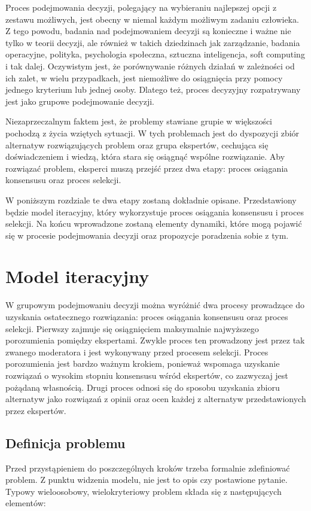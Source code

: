 Proces podejmowania decyzji, polegający na wybieraniu najlepszej opcji z 
zestawu możliwych, jest obecny w niemal każdym możliwym zadaniu człowieka. Z
tego powodu, badania nad podejmowaniem decyzji są konieczne i ważne nie tylko w 
teorii decyzji, ale również w takich dziedzinach jak zarządzanie, badania
operacyjne,  polityka, psychologia społeczna, sztuczna inteligencja, soft 
computing i tak dalej. Oczywistym jest, że porównywanie różnych działań w 
zależności od ich zalet, w wielu przypadkach, jest niemożliwe do osiągnięcia 
przy pomocy jednego kryterium lub jednej osoby. Dlatego też, proces decyzyjny 
rozpatrywany jest jako grupowe podejmowanie decyzji.

Niezaprzeczalnym faktem jest, że problemy stawiane grupie w większości pochodzą 
z życia wziętych sytuacji. W tych problemach jest do dyspozycji zbiór alternatyw
rozwiązujących problem oraz grupa ekspertów, cechująca się doświadczeniem i 
wiedzą, która stara się osiągnąć wspólne rozwiązanie. Aby rozwiązać problem, 
eksperci muszą przejść przez dwa etapy: proces osiągania konsensusu oraz proces 
selekcji.

W poniższym rozdziale te dwa etapy zostaną dokładnie opisane. Przedstawiony
będzie model iteracyjny, który wykorzystuje proces osiągania konsensusu i proces
selekcji. Na końcu wprowadzone zostaną elementy dynamiki, które mogą pojawić się
w procesie podejmowania decyzji oraz propozycje poradzenia sobie z tym.

\section{Model iteracyjny}
W grupowym podejmowaniu decyzji można wyróżnić dwa procesy prowadzące do
uzyskania ostatecznego rozwiązania: proces osiągania konsensusu oraz proces
selekcji. Pierwszy zajmuje się osiągnięciem maksymalnie najwyższego porozumienia
pomiędzy ekspertami. Zwykle proces ten prowadzony jest przez tak zwanego
moderatora i jest  wykonywany przed procesem selekcji. Proces porozumienia jest
bardzo ważnym krokiem, ponieważ wspomaga uzyskanie rozwiązań o wysokim stopniu
konsensusu wśród  ekspertów, co zazwyczaj jest pożądaną własnością. Drugi proces
odnosi się do sposobu uzyskania zbioru alternatyw jako rozwiązań z opinii oraz
ocen każdej z alternatyw przedstawionych przez ekspertów.

\subsection{Definicja problemu}
Przed przystąpieniem do poszczególnych kroków trzeba formalnie zdefiniować 
problem. Z punktu widzenia modelu, nie jest to opis czy postawione pytanie. 
Typowy wieloosobowy, wielokryteriowy problem składa się z następujących 
elementów:

